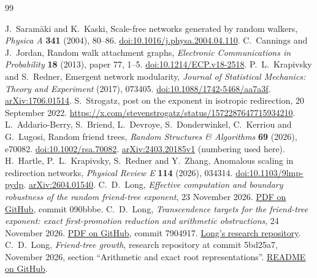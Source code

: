 \documentclass[11pt]{article}
\theoremstyle{remark}
\numberwithin{equation}{section}
\begin{document}
\begin{thebibliography}{99}
\raggedright
{} J.~Saram\"aki and K.~Kaski, Scale-free networks generated by random walkers, \emph{Physica A} \textbf{341} (2004), 80--86. \href{https://doi.org/10.1016/j.physa.2004.04.110}{doi:10.1016/j.physa.2004.04.110}.
 C.~Cannings and J.~Jordan, Random walk attachment graphs,
\emph{Electronic Communications in Probability} \textbf{18} (2013),
paper 77, 1--5. \href{https://doi.org/10.1214/ECP.v18-2518}{doi:10.1214/ECP.v18-2518}.
 P.~L.~Krapivsky and S.~Redner, Emergent network modularity,
\emph{Journal of Statistical Mechanics: Theory and Experiment} (2017),
073405. \href{https://doi.org/10.1088/1742-5468/aa7a3f}{doi:10.1088/1742-5468/aa7a3f}. \href{https://arxiv.org/abs/1706.01514}{arXiv:1706.01514}.
 S.~Strogatz, post on the exponent in isotropic
redirection, 20 September 2022.
\url{https://x.com/stevenstrogatz/status/1572287647715934210}.
 L.~Addario-Berry, S.~Briend, L.~Devroye, S.~Donderwinkel,
C.~Kerriou and G.~Lugosi, Random friend trees, \emph{Random Structures \& Algorithms} \textbf{69} (2026), e70082. \href{https://doi.org/10.1002/rsa.70082}{doi:10.1002/rsa.70082}.
\href{https://arxiv.org/abs/2403.20185v1}{arXiv:2403.20185v1} (numbering used here).
 H.~Hartle, P.~L.~Krapivsky, S.~Redner and Y.~Zhang,
Anomalous scaling in redirection networks, \emph{Physical Review E}
\textbf{114} (2026), 034314.
\href{https://doi.org/10.1103/9lmp-pydp}{doi:10.1103/9lmp-pydp}. \href{https://arxiv.org/abs/2604.01540}{arXiv:2604.01540}.
 C.~D.~Long, \emph{Effective computation and boundary robustness of the random friend-tree exponent}, 23 November 2026. \href{https://github.com/long-mathematics/friend-tree-growth/blob/090bbbe5faec83ec4124bd427eb5fda32c79bef1/friend_tree_growth.pdf}{PDF on GitHub}, commit 090bbbe.
 C.~D.~Long, \emph{Transcendence targets for the friend-tree exponent: exact first-promotion reduction and arithmetic obstructions}, 24 November 2026. \href{https://github.com/long-mathematics/friend-tree-growth/blob/790491725d9cf445789e14c24c277532f5d2e5c7/friend_tree_transcendence_progress.pdf}{PDF on GitHub}, commit 7904917. \href{https://github.com/long-mathematics/friend-tree-growth}{Long's research repository}.
 C.~D.~Long, \emph{Friend-tree growth}, research repository at commit 5bd25a7, November 2026, section ``Arithmetic and exact root representations''. \href{https://github.com/long-mathematics/friend-tree-growth/blob/5bd25a7d506cb64a8444b86334ab531d295f6c78/README.md#arithmetic-and-exact-root-representations}{README on GitHub}.

\end{thebibliography}
\end{document}
